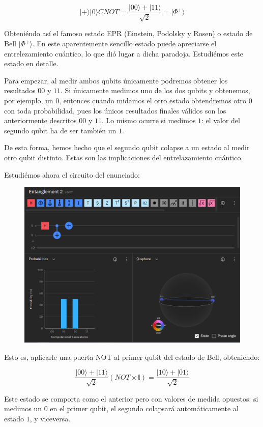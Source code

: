 \documentclass[11pt]{article}
\newcommand{\I}{\mathbb{I}}
\newcommand{\ra}{\rangle}
\newcommand{\ra}{\rangle}
\begin{document}
\[
	|+\ra|0\ra CNOT = \frac{|00\ra + |11\ra}{\sqrt 2} = |\Phi^+\ra
\]

Obteniéndo así el famoso estado EPR (Einstein, Podolsky y Rosen) o estado de Bell $|\Phi^+\ra$. En este aparentemente sencillo estado puede apreciarse el entrelezamiento cuántico, lo que dió lugar a dicha paradoja. Estudiémos este estado en detalle.

Para empezar, al medir ambos qubits únicamente podremos obtener los resultados $00$ y $11$. Si únicamente medimos uno de los dos qubits y obtenemos, por ejemplo, un $0$, entonces cuando midamos el otro estado obtendremos otro $0$ con toda probabilidad, pues los únicos resultados finales válidos son los anteriormente descritos $00$ y $11$. Lo mismo ocurre si medimos $1$: el valor del segundo qubit ha de ser también un $1$.

De esta forma, hemos hecho que el segundo qubit colapse a un estado al medir otro qubit distinto. Estas son las implicaciones del entrelazamiento cuántico.

Estudiémos ahora el circuito del enunciado:

\begin{figure}[H]
	\centering
	\includegraphics[scale=0.8]{figures/entanglement2.png}
\end{figure}

Esto es, aplicarle una puerta NOT al primer qubit del estado de Bell, obteniendo:

\[
	\frac{|00\ra + |11\ra}{\sqrt 2} (NOT \times \I) = \frac{|10\ra + |01\ra}{\sqrt 2}
\]

Este estado se comporta como el anterior pero con valores de medida opuestos: si medimos un $0$ en el primer qubit, el segundo colapsará automáticamente al estado $1$, y viceversa.
\end{document}
